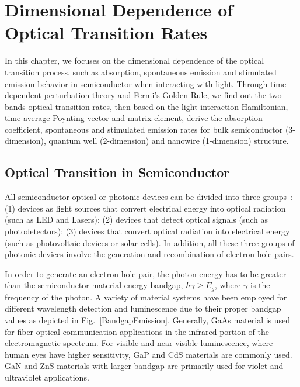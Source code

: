 \chapter[Transition Rates]{Dimensional Dependence of Optical Transition Rates}
\label{RM}

In this chapter, we focuses on the dimensional dependence of the optical
transition process, such as absorption, spontaneous emission and stimulated
emission behavior in semiconductor when interacting with light. Through
time-dependent perturbation theory and Fermi's Golden Rule, we find out the two
bands optical transition rates, then based on the light interaction
Hamiltonian, time average Poynting vector and matrix element, derive the
absorption coefficient, spontaneous and stimulated emission rates for bulk
semiconductor (3-dimension), quantum well (2-dimension) and nanowire
(1-dimension) structure.

\section{Optical Transition in Semiconductor} \label{OpticalProcess}

All semiconductor optical or photonic devices can be divided into three
groups~\cite{sze2006physics}: (1) devices as light sources that convert
electrical energy into optical radiation (such as LED and Lasers); (2) devices
that detect optical signals (such as photodetectors); (3) devices that convert
optical radiation into electrical energy (such as photovoltaic devices or solar
cells). In addition, all these three groups of photonic devices involve the
generation and recombination of electron-hole pairs.

In order to generate an electron-hole pair, the photon energy has to be greater
than the semiconductor material energy bandgap, $h\gamma\geq{E_g}$, where
$\gamma$ is the frequency of the photon. A variety of material systems have
been employed for different wavelength detection and luminescence due to their
proper bandgap values as depicted in Fig.~\ref{BandgapEmission}. Generally,
GaAs material is used for fiber optical communication applications in the
infrared portion of the electromagnetic spectrum. For visible and near visible
luminescence, where human eyes have higher sensitivity, GaP and CdS materials
are commonly used. GaN and ZnS materials with larger bandgap are primarily used
for violet and ultraviolet applications.

